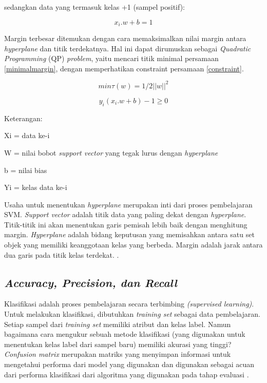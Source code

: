 sedangkan data yang termasuk kelas +1 (sampel positif):

\begin{equation}
	x_i.w + b = 1
\end{equation}

Margin terbesar ditemukan dengan cara memaksimalkan nilai margin antara \textit{hyperplane} dan titik terdekatnya. Hal ini dapat dirumuskan sebagai \textit{Quadratic Programming} (QP) \textit{problem}, yaitu mencari titik minimal persamaan \ref{minimalmargin}, dengan memperhatikan constraint persamaan \ref{constraint}.

\begin{equation}
	min \tau(w) = 1/2||w||^{2}
	\label{minimalmargin}
\end{equation}


\begin{equation}
	y_i(x_i.w + b) - 1 \ge 0
	\label{constraint}
\end{equation}

\par Keterangan:
\par Xi = data ke-i
\par W = nilai bobot \textit{support vector} yang tegak lurus dengan \textit{hyperplane}
\par b = nilai bias
\par Yi = kelas data ke-i


\par Usaha untuk menentukan \textit{hyperplane} merupakan inti dari proses pembelajaran SVM. \textit{Support vector} adalah titik data yang paling dekat dengan \textit{hyperplane}. Titik-titik ini akan menentukan garis pemisah lebih baik dengan menghitung margin. \textit{Hyperplane} adalah bidang keputusan yang memisahkan antara satu set objek yang memiliki keanggotaan kelas yang berbeda. Margin adalah jarak antara dua garis pada titik kelas terdekat. \citep{Zhibin2008}.


\subsection{\textit{Accuracy, Precision, dan Recall}}
\par Klasifikasi adalah proses pembelajaran secara
terbimbing \textit{(supervised learning)}. Untuk melakukan klasifikasi, dibutuhkan \textit{training set} sebagai data pembelajaran. Setiap sampel dari \textit{training set} memiliki atribut dan kelas label. Namun bagaimana cara mengukur sebuah metode klasifikasi (yang digunakan untuk menentukan kelas label dari sampel baru) memiliki akurasi yang tinggi? \textit{Confusion matrix} merupakan matriks yang menyimpan informasi untuk mengetahui performa dari model yang digunakan dan digunakan sebagai acuan dari performa klasifikasi dari algoritma yang digunakan pada tahap evaluasi \citep{Ariza18}.


